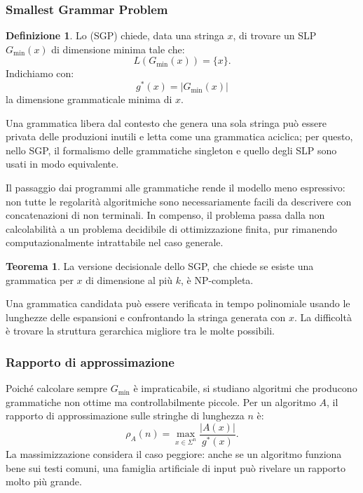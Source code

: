 \documentclass{article}
\theoremstyle{definition}
\newtheorem{theorem}{Teorema}[section] %
\newtheorem{definizione}{Definizione}[section]
\numberwithin{equation}{section}
\begin{document}
\subsubsection{Smallest Grammar Problem}
\begin{definizione}
    Lo \textbf{} (SGP) chiede, data una
    stringa $x$, di trovare un SLP $G_{\min}(x)$ di dimensione minima tale che:
    \[
        L(G_{\min}(x))=\{x\}.
    \]
    Indichiamo con:
    \[
        g^*(x)=|G_{\min}(x)|
    \]
    la dimensione grammaticale minima di $x$.
\end{definizione}

Una grammatica libera dal contesto che genera una sola stringa può essere
privata delle produzioni inutili e letta come una grammatica aciclica; per
questo, nello SGP, il formalismo delle grammatiche singleton e quello degli SLP
sono usati in modo equivalente.

Il passaggio dai programmi alle grammatiche rende il modello meno espressivo:
non tutte le regolarità algoritmiche sono necessariamente facili da descrivere
con concatenazioni di non terminali. In compenso, il problema passa dalla non
calcolabilità a un problema decidibile di ottimizzazione finita, pur rimanendo
computazionalmente intrattabile nel caso generale.

\begin{theorem}\label{theorem_sgp_np_complete}
    La versione decisionale dello SGP, che chiede se esiste una grammatica per
    $x$ di dimensione al più $k$, è NP-completa.
\end{theorem}

Una grammatica candidata può essere verificata in tempo polinomiale usando le
lunghezze delle espansioni e confrontando la stringa generata con $x$. La
difficoltà è trovare la struttura gerarchica migliore tra le molte possibili.

\subsubsection{Rapporto di approssimazione}
Poiché calcolare sempre $G_{\min}$ è impraticabile, si studiano algoritmi che
producono grammatiche non ottime ma controllabilmente piccole. Per un algoritmo
$A$, il rapporto di approssimazione sulle stringhe di lunghezza $n$ è:
\begin{equation}\label{eq:sgp_approximation_ratio}
    \rho_A(n)
    =
    \max_{x\in\Sigma^n}
    \frac{|A(x)|}{g^*(x)}.
\end{equation}
La massimizzazione considera il caso peggiore: anche se un algoritmo funziona
bene sui testi comuni, una famiglia artificiale di input può rivelare un
rapporto molto più grande.
\end{document}
